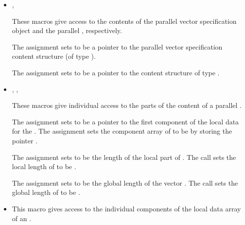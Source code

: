 \begin{itemize}

\item {}, 

      These macros give access to the contents of the parallel
      vector specification object and the parallel , respectively.           
                                                               
      The assignment  sets       
       to be a pointer to the parallel vector
      specification content structure (of type ).

      The assignment  sets       
       to be a pointer to the  content    
      structure of type .

\item {}, , 

      These macros give individual access to the parts of    
      the content of a parallel .                        
                                                               
      The assignment  sets  to be     
      a pointer to the first component of the local data for the  . 
      The assignment  sets the component array of 
       to be  by storing the pointer .                   
                                                               
      The assignment  sets  to be     
      the length of the local part of . 
      The call  sets      
      the local length of  to be .

      The assignment  sets  to  
      be the global length of the vector .                    
      The call  sets the global       
      length of  to be .

\item {}

      This macro gives access to the individual components of the local data
      array of an .


\end{itemize}
